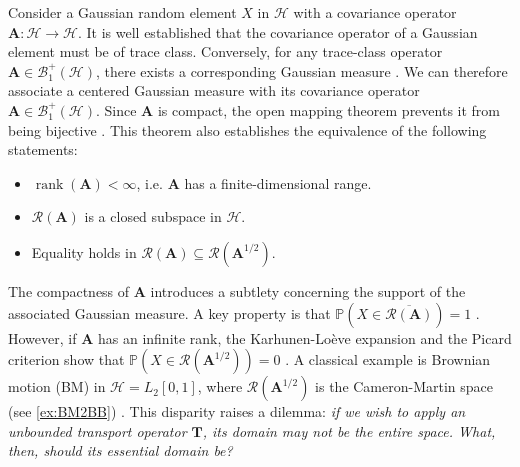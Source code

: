 \documentclass[noinfoline]{imsart}\setcounter{tocdepth}{2}
\renewcommand{\b}[1]{\mathbb{#1}} %
\newcommand{\m}[1]{\mathbf{#1}} %
\renewcommand{\c}[1]{\mathcal{#1}} %
\DeclareMathOperator*{\rk}{rank}
\theoremstyle{plain}
\begin{document}
Consider a Gaussian random element $X$ in $\c{H}$ with a covariance operator $\m{A}: \c{H} \rightarrow \c{H}$. It is well established that the covariance operator of a Gaussian element must be of trace class. Conversely, for any trace-class operator $\m{A} \in \c{B}_{1}^{+}(\c{H})$, there exists a corresponding Gaussian measure \cite{da2006introduction}. We can therefore associate a centered Gaussian measure with its covariance operator $\m{A} \in \c{B}_{1}^{+}(\c{H})$. Since $\m{A}$ is compact, the open mapping theorem prevents it from being bijective \cite{conway2019course}. This theorem also establishes the equivalence of the following statements:
\begin{itemize}
    \item $\rk (\m{A}) < \infty$, i.e. $\m{A}$ has a finite-dimensional range.
    \item $\c{R}(\m{A})$ is a closed subspace in $\c{H}$.
    \item Equality holds in $\c{R}(\m{A}) \subseteq \c{R}(\m{A}^{1/2})$.
\end{itemize}

The compactness of $\m{A}$ introduces a subtlety concerning the support of the associated Gaussian measure.
A key property is that $\b{P}(X \in \overline{\c{R}(\m{A})})=1$ \cite{hsing2015theoretical}. However, if $\m{A}$ has an infinite rank, the Karhunen-Lo\`{e}ve expansion and the Picard criterion show that $\b{P}(X \in \c{R}(\m{A}^{1/2}))=0$ \cite{bogachev1998gaussian, hairer2009introduction}. A classical example is Brownian motion (BM) in $\c{H} = L_{2} [0, 1]$, where $\c{R}(\m{A}^{1/2})$ is the Cameron-Martin space (see \cref{ex:BM2BB}) \cite{nualart2006malliavin, paulsen2016introduction, da2006introduction}. 
This disparity raises a dilemma: \emph{if we wish to apply an unbounded transport operator $\m{T}$, its domain may not be the entire space. What, then, should its essential domain be?}
\end{document}
